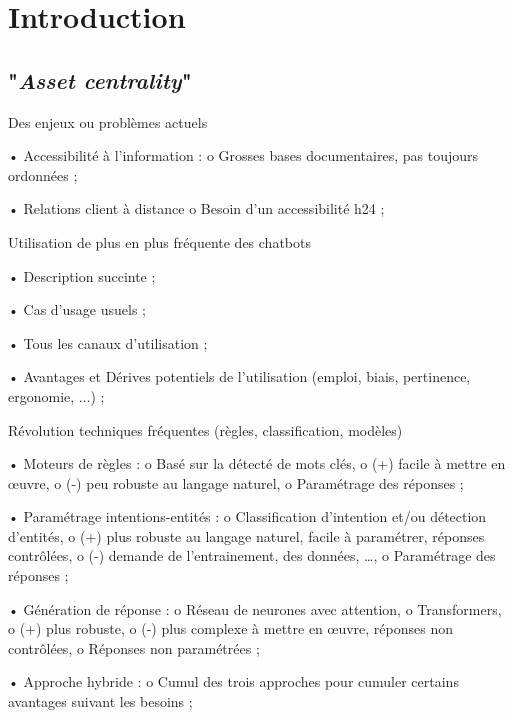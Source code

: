 \chapter{Introduction}
    \label{chapter:1-INTRODUCTION}

    \section{"\textit{Asset centrality}"}

    \begin{todolist}
    
        \item Des enjeux ou problèmes actuels

            •	Accessibilité à l'information :
                o	Grosses bases documentaires, pas toujours ordonnées ;

            •	Relations client à distance
                o   Besoin d'un accessibilité h24 ;

        \item Utilisation de plus en plus fréquente des chatbots
        
            •   Description succinte ;

            •   Cas d'usage usuels ;

            •   Tous les canaux d'utilisation ;

            •   Avantages et Dérives potentiels de l'utilisation (emploi, biais, pertinence, ergonomie, ...) ;

        \item Révolution techniques fréquentes (règles, classification, modèles)

            •	Moteurs de règles :
                o	Basé sur la détecté de mots clés,
                o	(+) facile à mettre en œuvre,
                o	(-) peu robuste au langage naturel,
                o	Paramétrage des réponses ;

            •	Paramétrage intentions-entités :
                o	Classification d’intention et/ou détection d’entités,
                o	(+) plus robuste au langage naturel, facile à paramétrer, réponses contrôlées,
                o	(-) demande de l’entrainement, des données, …,
                o	Paramétrage des réponses ;

            •	Génération de réponse :
                o	Réseau de neurones avec attention,
                o	Transformers,
                o	(+) plus robuste,
                o	(-) plus complexe à mettre en œuvre, réponses non contrôlées,
                o	Réponses non paramétrées ;

            •	Approche hybride :
                o   Cumul des trois approches pour cumuler certains avantages suivant les besoins ;
	\end{todolist}

